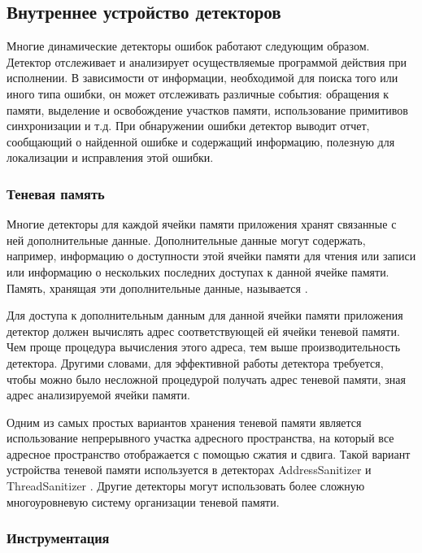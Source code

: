 \subsection{Внутреннее устройство детекторов}

Многие динамические детекторы ошибок работают следующим образом.
Детектор отслеживает и анализирует осуществляемые программой действия при исполнении.
В зависимости от информации, необходимой для поиска того или иного типа ошибки, он может отслеживать различные события: обращения к памяти, выделение и освобождение участков памяти, использование примитивов синхронизации и т.д.
При обнаружении ошибки детектор выводит отчет, сообщающий о найденной ошибке и содержащий информацию, полезную для локализации и исправления этой ошибки.


\subsubsection{Теневая память}

Многие детекторы для каждой ячейки памяти приложения хранят связанные с ней дополнительные данные.
Дополнительные данные могут содержать, например, информацию о доступности этой ячейки памяти для чтения или записи или информацию о нескольких последних доступах к данной ячейке памяти.
Память, хранящая эти дополнительные данные, называется .

Для доступа к дополнительным данным для данной ячейки памяти приложения детектор должен вычислять адрес соответствующей ей ячейки теневой памяти.
Чем проще процедура вычисления этого адреса, тем выше производительность детектора.
Другими словами, для эффективной работы детектора требуется, чтобы можно было несложной процедурой получать адрес теневой памяти, зная адрес анализируемой ячейки памяти.

Одним из самых простых вариантов хранения теневой памяти является использование непрерывного участка адресного пространства, на который все адресное пространство отображается с помощью сжатия и сдвига.
Такой вариант устройства теневой памяти используется в детекторах AddressSanitizer \cite{asan} и ThreadSanitizer \cite{tsan}.
Другие детекторы \cite{memcheck} могут использовать более сложную многоуровневую систему организации теневой памяти.


\subsubsection{Инструментация}

